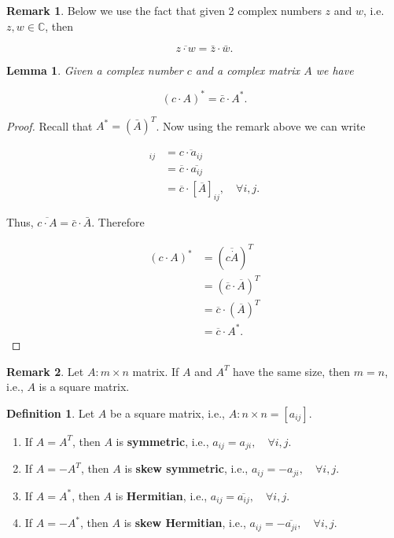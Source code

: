 \documentclass[12pt]{article}
\newtheorem*{lemma}{Lemma}
\theoremstyle{definition}
\newtheorem*{definition}{Definition}
\newtheorem*{remark}{Remark}
\begin{document}
\begin{enumerate}[label=\Roman*)]
\begin{remark}
Below we use the fact that given 2 complex numbers $z$ and $w$, i.e.
$z, w \in \mathbb{C}$, then

$$ \overline{z \cdot w} = \bar{z} \cdot \bar{w}. $$
\end{remark}

\begin{lemma}
Given a complex number $c$ and a complex matrix $A$ we have

$$ (c \cdot A)^* = \bar{c} \cdot A^*. $$
\end{lemma}

\begin{proof}
Recall that $A^* = (\bar{A})^T$. Now using the remark above we can write

\begin{align*}
[\overline{c \cdot A}]_{ij} &= \overline{c \cdot a_{ij}} \\
&= \overline{c} \cdot \overline{a_{ij}} \\
&= \overline{c} \cdot [\overline{A}]_{ij}, \quad \forall i, j. 
\end{align*}

Thus, $\overline{c \cdot A} = \bar{c} \cdot \bar{A}$. Therefore

\begin{align*}
(c \cdot A)^* &= (\overline{c \dot A})^T \\
&= (\overline{c} \cdot \overline{A})^T \\
&= \overline{c} \cdot (\overline{A})^T \\
&= \overline{c} \cdot A^*.
\end{align*}
\end{proof}

\end{enumerate}


\begin{remark}
Let $A : m \times n$ matrix. If $A$ and $A^T$ have the same size, then $m = n$,
i.e., $A$ is a square matrix.
\end{remark}

\begin{definition}
Let $A$ be a square matrix, i.e., $A : n \times n = [a_{ij}]$.

\begin{enumerate}
\item If $A = A^T$, then $A$ is \textbf{symmetric}, i.e., 
$a_{ij} = a_{ji}, \quad \forall i, j$.

\item If $A = -A^T$, then $A$ is \textbf{skew symmetric}, i.e.,
$a_{ij} = -a_{ji}, \quad \forall i, j$.

\item If $A = A^*$, then $A$ is \textbf{Hermitian}, i.e., 
$a_{ij} = \overline{a_{ij}}, \quad \forall i, j$.

\item If $A = -A^*$, then $A$ is \textbf{skew Hermitian}, i.e.,
$a_{ij} = -\overline{a_{ji}}, \quad \forall i, j$.
\end{enumerate}

\end{definition}
\end{document}
